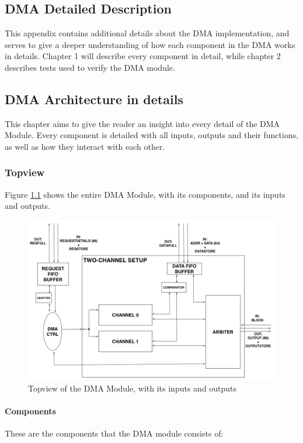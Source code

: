 \begin{appendix}

\chapter{DMA Detailed Description}
\label{app:DMA-arch}
This appendix contains additional details about the DMA implementation, and serves to give a deeper understanding of how each component in the DMA works in details.
Chapter 1 will describe every component in detail, while chapter 2 describes tests used to verify the DMA module.
\section{DMA Architecture in details}
This chapter aims to give the reader an insight into every detail of the DMA Module.
Every component is detailed with all inputs, outputs and their functions, as well as how they interact with each other.


\subsection{Topview}
Figure \ref{fig:TopViewFinalSimple2IO} shows the entire DMA Module, with its components, and its inputs and outputs.


\begin{figure}[h!]
    \centering
    \includegraphics[width=1.0\textwidth]{Figures/DMA/TopViewFinalSimple2IO}
    \caption{Topview of the DMA Module, with its inputs and outputs}
    \label{fig:TopViewFinalSimple2IO}
\end{figure}

\subsubsection{Components}
These are the components that the DMA module consists of:


\end{appendix}
